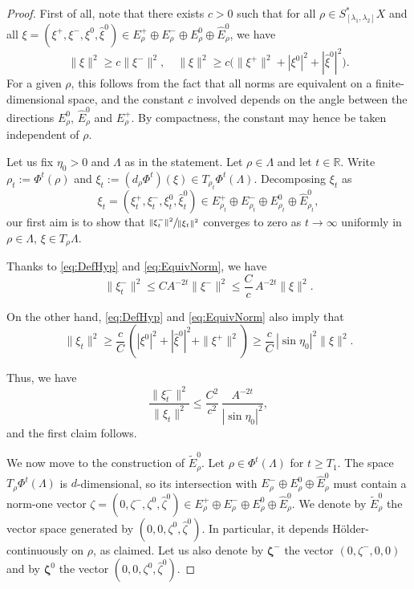 \documentclass[JEP,XML,SOM,Unicode,published]{cedram}
\theoremstyle{plain}
\theoremstyle{definition}
\newcommand{\R}{\mathbb{R}}
\begin{document}
\begin{proof}
First of all, note that there exists $c>0$ such that for all $\rho\in S^*_{[\lambda_1,\lambda_2]} X$ and all $\xi=(\xi^+,\xi^-,\xi^0, \hat{\xi}^0)\in E^+_{\rho}\oplus E^-_{\rho}\oplus E^0_{\rho}\oplus \hat{E}^0_{\rho}$, we have
\begin{equation}\label{eq:EquivNorm}
\|\xi\|^2 \geq c \|\xi^-\|^2,
\quad\|\xi\|^2 \geq c \bigl(\|\xi^+\|^2 + |\xi^0|^2 + |\hat{\xi}^0|^2 \bigl).
\end{equation}
For a given $\rho$, this follows from the fact that all norms are equivalent on a finite-dimensional space, and the constant $c$ involved depends on the angle between the directions $E^0_\rho$, $\hat{E}^0_\rho$ and $E^+_\rho$. By compactness, the constant may hence be taken independent of $\rho$.

Let us fix $\eta_0>0$ and $\Lambda$ as in the statement. Let $\rho\in \Lambda$ and let $t\in \R$. Write $\rho_t := \Phi^t(\rho)$ and $\xi_t := (d_\rho \Phi^t)(\xi)\in T_{\rho_t} \Phi^t(\Lambda)$. Decomposing $\xi_t$ as
\[
\xi_t=(\xi_t^+,\xi_t^-,\xi_t^0, \hat{\xi}_t^0)\in E^+_{\rho_t}\oplus E^-_{\rho_t}\oplus E^0_{\rho_t}\oplus \hat{E}^0_{\rho_t},
\]
our first aim is to show that $\sfrac{\|\xi_t^-\|^2}{\|\xi_t\|^2}$ converges to zero as $t\to \infty$ uniformly in $\rho\in \Lambda$, $\xi\in T_\rho \Lambda$.

Thanks to \eqref{eq:DefHyp} and \eqref{eq:EquivNorm}, we have
\[
\|\xi_t^-\|^2 \leq C A^{-2t} \|\xi^-\|^2 \leq \frac{C}{c}\, A^{-2t} \|\xi\|^2.
\]

On the other hand, \eqref{eq:DefHyp} and \eqref{eq:EquivNorm} also imply that
\[
\|\xi_t\|^2 \geq \frac{c}{C}\, (|\xi^0|^2+ |\hat{\xi}^0|^2 + \|\xi^+\|^2) \geq \frac{c}{C}\, |\sin \eta_0|^2 \|\xi\|^2.
\]

Thus, we have
\begin{equation}\label{eq:AlejandroTuDoisCandidater}
\frac{\|\xi_t^-\|^2}{\|\xi_t\|^2}\leq \frac{C^2}{c^2}\, \frac{A^{-2t}}{|\sin \eta_0|^2},
\end{equation}
and the first claim follows.

We now move to the construction of $\tilde{E}_\rho^0$. Let $\rho\in \Phi^t(\Lambda)$ for $t\geq T_1$. The space $T_\rho \Phi^t(\Lambda)$ is $d$-dimensional, so its intersection with $E^-_{\rho}\oplus E^0_{\rho}\oplus \hat{E}^0_{\rho}$ must contain a norm-one vector $\zeta=(0,\zeta^-, \zeta^0, \hat{\zeta}^0)\in E^+_{\rho}\oplus E^-_{\rho}\oplus E^0_{\rho}\oplus \hat{E}^0_{\rho}$. We denote by $\tilde{E}_\rho^0$ the vector space generated by $(0, 0, \zeta^0, \hat{\zeta}^0)$. In particular, it depends Hölder-continuously on $\rho$, as claimed. Let us also denote by $\boldsymbol{\zeta}^-$ the vector $(0,\zeta^-, 0, 0)$ and by $\boldsymbol{\zeta}^0$ the vector $(0, 0, \zeta^0, \hat{\zeta}^0)$.


\end{proof}
\end{document}
